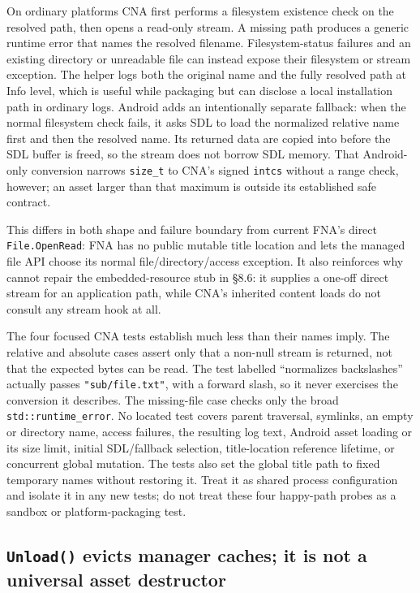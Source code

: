 On ordinary platforms CNA first performs a filesystem existence check on the resolved path, then
opens a read-only stream. A missing path produces a generic runtime error that names the resolved
filename. Filesystem-status failures and an existing directory or unreadable file can instead
expose their filesystem or stream exception. The helper logs both the original name and the fully
resolved path at Info level, which is useful while packaging but can disclose a local installation
path in ordinary logs. Android adds an intentionally separate fallback: when the normal filesystem
check fails, it asks SDL to load the normalized relative name first and then the resolved name. Its
returned data are copied into
 before the SDL buffer is freed, so the stream does not borrow SDL memory.
That Android-only conversion narrows \texttt{size\_t} to CNA's signed \texttt{intcs} without a
range check, however; an asset larger than that maximum is outside its established safe contract.

This differs in both shape and failure boundary from current FNA's direct
\texttt{File.OpenRead}: FNA has no public mutable title location and lets the managed file API
choose its normal file/directory/access exception. It also reinforces why
 cannot repair the embedded-resource stub in \S8.6: it supplies a
one-off direct stream for an application path, while CNA's inherited content loads do not consult
any stream hook at all.

The four focused CNA tests establish much less than their names imply. The relative and absolute
cases assert only that a non-null stream is returned, not that the expected bytes can be read. The
test labelled ``normalizes backslashes'' actually passes \texttt{"sub/file.txt"}, with a forward
slash, so it never exercises the conversion it describes. The missing-file case checks only the
broad \texttt{std::runtime\_error}. No located test covers parent traversal, symlinks, an empty
or directory name, access failures, the resulting log text, Android asset loading or its size
limit, initial SDL/fallback selection, title-location reference lifetime, or concurrent global
mutation. The tests also set the global title path to fixed temporary names without restoring it.
Treat it as shared process configuration and isolate it in any new tests; do not treat these four
happy-path probes as a sandbox or platform-packaging test.

\subsection{\texttt{Unload()} evicts manager caches; it is not a universal asset destructor}

